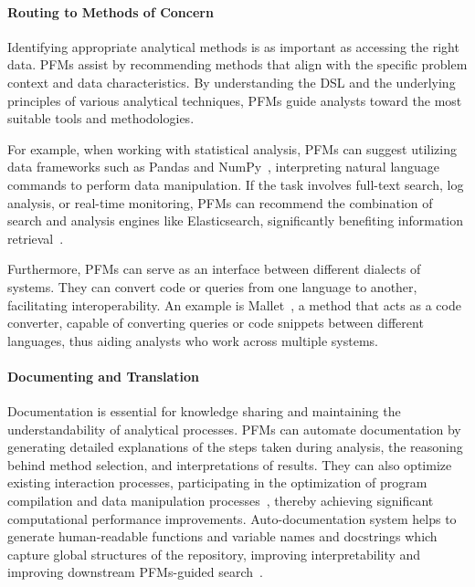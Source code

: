   \paragraph{Routing to Methods of Concern}
  
  Identifying appropriate analytical methods is as important as accessing the right data. PFMs assist by recommending methods that align with the specific problem context and data characteristics. By understanding the DSL and the underlying principles of various analytical techniques, PFMs guide analysts toward the most suitable tools and methodologies.
  
  For example, when working with statistical analysis, PFMs can suggest utilizing data frameworks such as Pandas and NumPy~\cite{lai2023ds}, interpreting natural language commands to perform data manipulation. If the task involves full-text search, log analysis, or real-time monitoring, PFMs can recommend the combination of search and analysis engines like Elasticsearch, significantly benefiting information retrieval~\cite{zhu2024retrieval}.
  
  Furthermore, PFMs can serve as an interface between different dialects of systems. They can convert code or queries from one language to another, facilitating interoperability. An example is Mallet~\cite{ngom2024mallet}, a method that acts as a code converter, capable of converting queries or code snippets between different languages, thus aiding analysts who work across multiple systems.
  
  \paragraph{Documenting and Translation}
  
  Documentation is essential for knowledge sharing and maintaining the understandability of analytical processes. PFMs can automate documentation by generating detailed explanations of the steps taken during analysis, the reasoning behind method selection, and interpretations of results. They can also optimize existing interaction processes, participating in the optimization of program compilation and data manipulation processes~\cite{cummins2023large, cummins2024meta, li2024can}, thereby achieving significant computational performance improvements. Auto-documentation system helps to generate human-readable functions and variable names and docstrings which capture global structures of the repository, improving interpretability and improving downstream PFMs-guided search~\cite{GrandWBOLTA24}.
  
